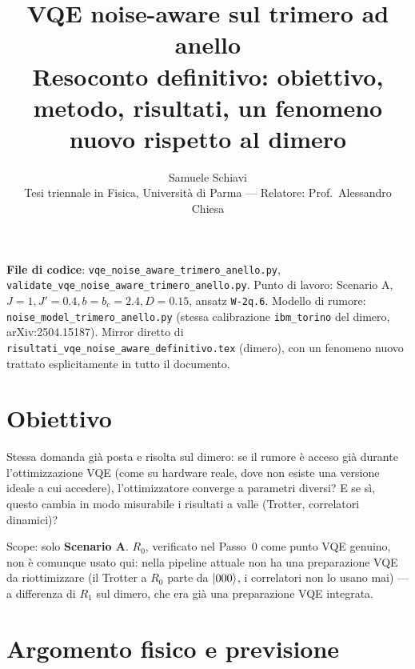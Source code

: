 \documentclass[11pt,a4paper]{article}
\title{\bfseries VQE noise-aware sul trimero ad anello\\[2pt]
\large Resoconto definitivo: obiettivo, metodo, risultati, un fenomeno nuovo rispetto al dimero}
\author{Samuele Schiavi \\ \small Tesi triennale in Fisica, Università di Parma
--- Relatore: Prof.\ Alessandro Chiesa}
\date{}
\begin{document}
\maketitle
\thispagestyle{fancy}

\noindent\textbf{File di codice}: \texttt{vqe\_noise\_aware\_\allowbreak trimero\_anello.py},
\texttt{validate\_vqe\_noise\_aware\_\allowbreak trimero\_anello.py}. Punto di lavoro: Scenario A,
$J{=}1,J'{=}0.4,b{=}b_c{=}2.4,D{=}0.15$, ansatz \texttt{W-2q.6}. Modello di rumore:
\texttt{noise\_model\_trimero\_anello.py} (stessa calibrazione \texttt{ibm\_torino} del dimero,
arXiv:2504.15187). Mirror diretto di \texttt{risultati\_vqe\_noise\_aware\_\allowbreak definitivo.tex}
(dimero), con un fenomeno nuovo trattato esplicitamente in tutto il documento.

\tableofcontents

\section{Obiettivo}

Stessa domanda già posta e risolta sul dimero: se il rumore è acceso già durante
l'ottimizzazione VQE (come su hardware reale, dove non esiste una versione ideale a cui
accedere), l'ottimizzatore converge a parametri diversi? E se sì, questo cambia in modo
misurabile i risultati a valle (Trotter, correlatori dinamici)?


Scope: solo \textbf{Scenario A}. $R_0$, verificato nel Passo~0 come punto VQE genuino, non è
comunque usato qui: nella pipeline attuale non ha una preparazione VQE da riottimizzare (il
Trotter a $R_0$ parte da $\lvert 000\rangle$, i correlatori non lo usano mai) --- a differenza di $R_1$
sul dimero, che era già una preparazione VQE integrata.

\section{Argomento fisico e previsione}
\end{document}
